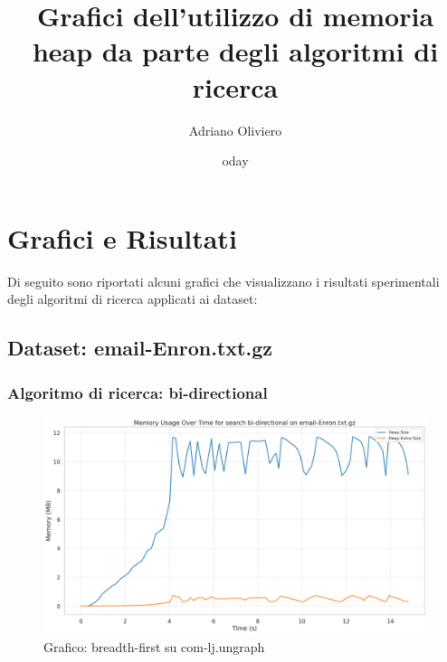 \documentclass{article}
\title{Grafici dell'utilizzo di memoria heap da parte degli algoritmi di ricerca}
\author{Adriano Oliviero}
\date{	oday}
\begin{document}
\maketitle
\tableofcontents
\newpage
\section{Grafici e Risultati}
Di seguito sono riportati alcuni grafici che visualizzano i risultati sperimentali degli algoritmi di ricerca applicati ai dataset:
\subsection{Dataset: email-Enron.txt.gz}
\subsubsection{Algoritmo di ricerca: bi-directional}
\begin{figure}[h]\centering
\includegraphics[width=\textwidth]{../plots/email-Enron_bi-directional.png}
\caption{Grafico: breadth-first su com-lj.ungraph}
\end{figure}
\end{document}
